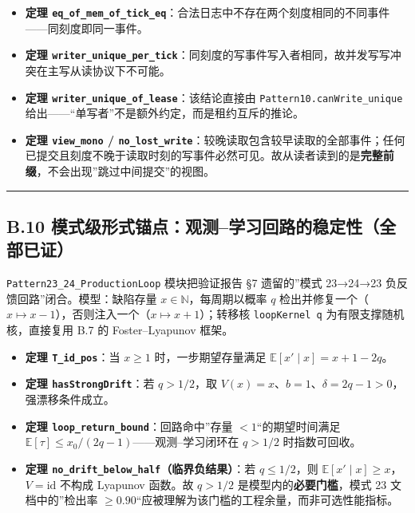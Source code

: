 \begin{itemize}
\tightlist
\item
  \textbf{定理
  \texttt{eq\_of\_mem\_of\_tick\_eq}}：合法日志中不存在两个刻度相同的不同事件------同刻度即同一事件。
\item
  \textbf{定理
  \texttt{writer\_unique\_per\_tick}}：同刻度的写事件写入者相同，故并发写写冲突在主写从读协议下不可能。
\item
  \textbf{定理 \texttt{writer\_unique\_of\_lease}}：该结论直接由
  \texttt{Pattern10.canWrite\_unique}
  给出------``单写者''不是额外约定，而是租约互斥的推论。
\item
  \textbf{定理 \texttt{view\_mono} /
  \texttt{no\_lost\_write}}：较晚读取包含较早读取的全部事件；任何已提交且刻度不晚于读取时刻的写事件必然可见。故从读者读到的是\textbf{完整前缀}，不会出现''跳过中间提交''的视图。
\end{itemize}

\begin{center}\rule{0.5\linewidth}{0.5pt}\end{center}

\subsection{B.10
模式级形式锚点：观测--学习回路的稳定性（全部已证）}\label{b.10-ux6a21ux5f0fux7ea7ux5f62ux5f0fux951aux70b9ux89c2ux6d4bux5b66ux4e60ux56deux8defux7684ux7a33ux5b9aux6027ux5168ux90e8ux5df2ux8bc1}

\texttt{Pattern23\_24\_ProductionLoop} 模块把验证报告 §7 遗留的''模式
23→24→23 负反馈回路''闭合。模型：缺陷存量
\(x\in\mathbb N\)，每周期以概率 \(q\)
检出并修复一个（\(x\mapsto x-1\)），否则注入一个（\(x\mapsto x+1\)）；转移核
\texttt{loopKernel\ q} 为有限支撑随机核，直接复用 B.7 的
Foster--Lyapunov 框架。

\begin{itemize}
\tightlist
\item
  \textbf{定理 \texttt{T\_id\_pos}}：当 \(x\ge 1\) 时，一步期望存量满足
  \(\mathbb E[x'\mid x]=x+1-2q\)。
\item
  \textbf{定理 \texttt{hasStrongDrift}}：若 \(q>1/2\)，取
  \(V(x)=x\)、\(b=1\)、\(\delta=2q-1>0\)，强漂移条件成立。
\item
  \textbf{定理 \texttt{loop\_return\_bound}}：回路命中''存量
  \(<1\)``的期望时间满足
  \(\mathbb E[\tau]\le x_0/(2q-1)\)------观测--学习闭环在 \(q>1/2\)
  时指数可回收。
\item
  \textbf{定理 \texttt{no\_drift\_below\_half}（临界负结果）}：若
  \(q\le 1/2\)，则 \(\mathbb E[x'\mid x]\ge x\)，\(V=\mathrm{id}\)
  不构成 Lyapunov 函数。故 \(q>1/2\) 是模型内的\textbf{必要门槛}，模式
  23 文档中的''检出率
  \(\ge0.90\)``应被理解为该门槛的工程余量，而非可选性能指标。
\end{itemize}

